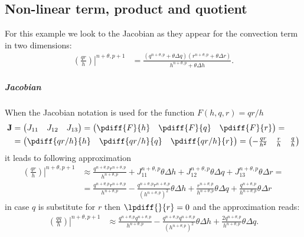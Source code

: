 \subsection{Non-linear term, product and quotient}
For this example we look  to the Jacobian as they appear for the convection term in two dimensions:
\begin{align}
    \left.\left(\frac{qr}{h}\right)\right|^{n+\theta, p+1} & = \frac{ \left(q^{n+\theta, p} + \theta  \Delta q\right)\left( r^{n+\theta, p} + \theta  \Delta r \right) }{ h^{n+\theta, p} + \theta  \Delta h}.
\end{align}

\subparagraph*{Jacobian}
When the Jacobian notation is  used for the function $F(h,q, r) = qr/h$
\begin{align}
    \mat{J} & =
    \begin{pmatrix}
        J_{11} & J_{12} & J_{13}
    \end{pmatrix}
    =
    \begin{pmatrix}
        \pdiff{F}{h} & \pdiff{F}{q} & \pdiff{F}{r}
    \end{pmatrix}
    =
    \\
    & = \begin{pmatrix}
        \pdiff{qr/h}{h} & \pdiff{qr/h}{q} & \pdiff{qr/h}{r}
    \end{pmatrix}
    =
    \begin{pmatrix}
        -\frac{qr}{h^2} & \frac{r}{h} & \frac{q}{h}
    \end{pmatrix}
\end{align}
it leads to following approximation
\begin{align}
    \left.\left(\frac{qr}{h}\right)\right|^{n+\theta, p+1} &  \approx  \frac{q^{n+\theta, p}r^{n+\theta, p}}{h^{n+\theta, p}}
    + J_{11}^{n+\theta, p} \theta\Delta h
    + J_{12}^{n+\theta, p} \theta\Delta q
    + J_{13}^{n+\theta, p} \theta\Delta r=
    \\
    & = \frac{q^{n+\theta, p}r^{n+\theta, p}}{h^{n+\theta, p}}
    - \frac{q^{n+\theta, p}r^{n+\theta, p}}{(h^{n+\theta, p})^2} \theta\Delta h
    + \frac{r^{n+\theta, p}}{h^{n+\theta, p}} \theta\Delta q
    + \frac{q^{n+\theta, p}}{h^{n+\theta, p}} \theta\Delta r
    \label{eq:2d_convection_q_equation}
\end{align}
in case $q$ is substitute for $r$ then $\lpdiff{}{r}=0$ and the approximation reads:
\begin{align}
    \left.\left(\frac{qq}{h}\right)\right|^{n+\theta, p+1} &  \approx
\frac{q^{n+\theta, p}q^{n+\theta, p}}{h^{n+\theta, p}}
- \frac{q^{n+\theta, p}q^{n+\theta, p}}{(h^{n+\theta, p})^2} \theta\Delta h
+ \frac{2 q^{n+\theta, p}}{h^{n+\theta, p}} \theta\Delta q.
\label{eq:convection_jacobian_qqh}
\end{align}

